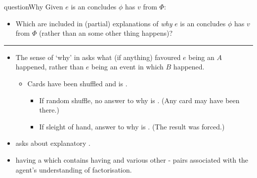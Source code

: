 \documentclass[10pt]{article}
\newcommand\lLine{{\color{lightgray} \noindent\rule{\textwidth}{0.4pt}}}
\newcommand{\hand}{\ding{43}}
\begin{document}
\begin{note}
  \begin{question}{questionWhy}{\qWhy{}}
    Given \(e\) is an  \vAgent{} concludes \prop{} \(\phi\) has \val{} \(v\) from \pool{} \(\Phi\):
    \begin{itemize}
    \item
      Which  are included in (partial) explanations of \emph{why} \(e\) is an  \vAgent{} concludes \prop{} \(\phi\) has \val{} \(v\) from \pool{} \(\Phi\) (rather than an  some other thing happens)?
    \end{itemize}
    \vspace{-1\baselineskip}
  \end{question}
\end{note}


\lLine


\begin{note}
  \begin{itemize}
  \item
    The sense of `why' in \qWhy{} asks what (if anything) favoured \(e\) being an \eiw{} \(A\) happened, rather than \(e\) being an event in which \(B\) happened.
    \begin{itemize}
    \item
      Cards have been shuffled and \mainCard{} is \mainCardPos{}.
      \begin{itemize}
      \item
        If random shuffle, no answer to why \mainCard{} is \mainCardPos{}. \hfill (Any card may have been there.)
      \item
        If sleight of hand, answer to why \mainCard{} is \mainCardPos{}. \hfill (The result was forced.)
      \end{itemize}
    \end{itemize}
  \end{itemize}

  \begin{itemize}
  \item[\hand]
    \qWhy{} asks about explanatory .
  \item
    \propM{\rootsCon{}} having \val{}  \fof{} a \pool{} which contains \propM{\rootsConEq{}} having \val{}  and various other - pairs associated with the agent's understanding of factorisation.
  \end{itemize}

\end{note}
\end{document}
